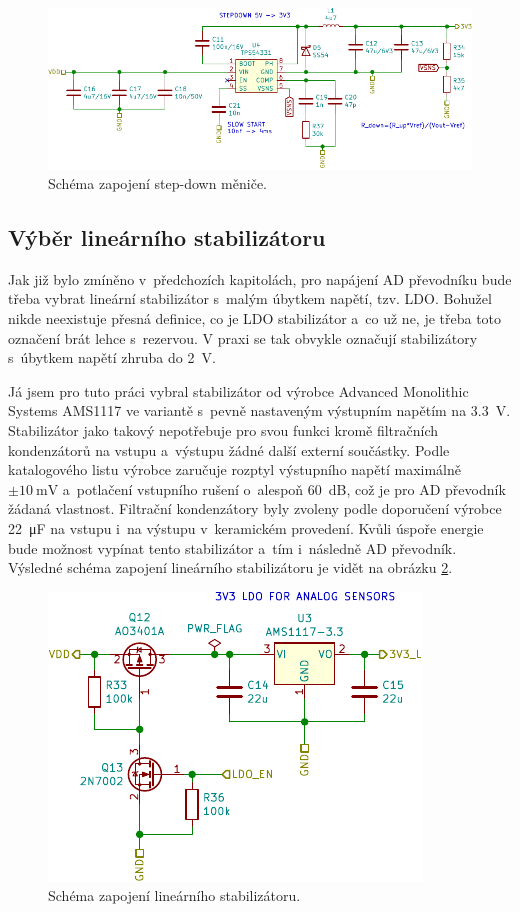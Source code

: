 \begin{figure}[h]
    \centering
    \includegraphics{obrazky/stepdown_schematic.pdf}
    \caption{Schéma zapojení step-down měniče.}
    \label{fig_StepDown-schematic}
\end{figure}

\subsection{Výběr lineárního stabilizátoru}

Jak již bylo zmíněno v~předchozích kapitolách, pro napájení AD převodníku bude třeba vybrat lineární stabilizátor s~malým úbytkem napětí, tzv. LDO. Bohužel nikde neexistuje přesná definice, co je LDO stabilizátor a~co už ne, je třeba toto označení brát lehce s~rezervou. V praxi se tak obvykle označují stabilizátory s~úbytkem napětí zhruba do \SI{2}{\volt}.

Já jsem pro tuto práci vybral stabilizátor od výrobce Advanced Monolithic Systems AMS1117 \cite{dat_AMS1117} ve variantě s~pevně nastaveným výstupním napětím na \SI{3,3}{\volt}. Stabilizátor jako takový nepotřebuje pro svou funkci kromě filtračních kondenzátorů na vstupu a~výstupu žádné další externí součástky. Podle katalogového listu výrobce zaručuje rozptyl výstupního napětí maximálně $\pm\SI{10}{\milli\volt}$ a~potlačení vstupního rušení o~alespoň \SI{60}{\deci\bel}, což je pro AD převodník žádaná vlastnost. Filtrační kondenzátory byly zvoleny podle doporučení výrobce \SI{22}{\micro\farad} na vstupu i~na výstupu v~keramickém provedení. Kvůli úspoře energie bude možnost vypínat tento stabilizátor a~tím i~následně AD převodník. Výsledné schéma zapojení lineárního stabilizátoru je vidět na obrázku \ref{fig_LDO-schematic}.

\begin{figure}[h]
    \centering
    \includegraphics{obrazky/ldo-schematic.pdf}
    \caption{Schéma zapojení lineárního stabilizátoru.}
    \label{fig_LDO-schematic}
\end{figure}

